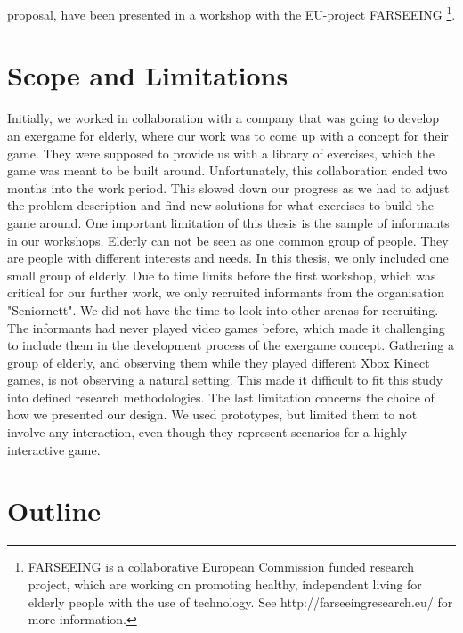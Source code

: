 proposal, have been presented in a workshop with the EU-project FARSEEING \footnote{FARSEEING is a collaborative European Commission funded research project, which are working on promoting healthy, independent living for elderly people with the use of technology. See http://farseeingresearch.eu/ for more information.}.     

\section{Scope and Limitations}
Initially, we worked in collaboration with a company that was going to develop an exergame for elderly, where our work was to come up with a concept for their game. They were supposed to provide us with a library of exercises, which the game was meant to be built around. Unfortunately, this collaboration ended two months into the work period. This slowed down our progress as we had to adjust the problem description and find new solutions for what exercises to build the game around. One important limitation of this thesis is the sample of informants in our workshops. Elderly can not be seen as one common group of people. They are people with different interests and needs. In this thesis, we only included one small group of elderly. Due to time limits before the first workshop, which was critical for our further work, we only recruited informants from the organisation "Seniornett". We did not have the time to look into other arenas for recruiting. The informants had never played video games before, which made it challenging to include them in the development process of the exergame concept. Gathering a group of elderly, and observing them while they played different Xbox Kinect games, is not observing a natural setting. This made it difficult to fit this study into defined research methodologies. The last limitation concerns the choice of how we presented our design. We used prototypes, but limited them to not involve any interaction, even though they represent scenarios for a highly interactive game.  


\section{Outline}